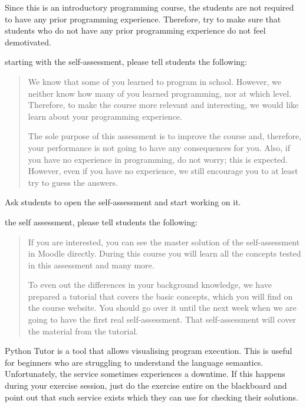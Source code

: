 \begin{Explanation}
    Since this is an introductory programming course, the students are
    not required to have any prior programming experience. Therefore,
    try to make sure that students who do not have any prior programming
    experience do not feel demotivated.
\end{Explanation}

 starting with the self-assessment, please tell students
the following:

\begin{quote}
    We know that some of you learned to program in school. However, we
    neither know how many of you learned programming, nor at which
    level. Therefore, to make the course more relevant and interesting,
    we would like learn about your programming experience.

    The sole purpose of this assessment is to improve the course and,
    therefore, your performance is not going to have any consequences
    for you. Also, if you have no experience in programming, do not
    worry; this is expected. However, even if you have no experience, we
    still encourage you to at least try to guess the answers.
\end{quote}

Ask students to open the self-assessment and start working on it.

 the self assessment, please tell students the following:

\begin{quote}
    If you are interested, you can see the master solution of the
    self-assessment in Moodle directly. During this course you will
    learn all the concepts tested in this assessment and many more.

    To even out the differences in your background knowledge, we have
    prepared a tutorial that covers the basic concepts, which you will
    find on the course website. You should go over it until the next
    week when we are going to have the first real self-assessment. That
    self-assessment will cover the material from the tutorial.
\end{quote}


\begin{Explanation}
    Python Tutor is a tool that allows visualising program execution.
    This is useful for beginners who are struggling to understand the
    language semantics. Unfortunately, the service sometimes experiences
    a downtime. If this happens during your exercise session, just do
    the exercise entire on the blackboard and point out that such
    service exists which they can use for checking their solutions.
\end{Explanation}

